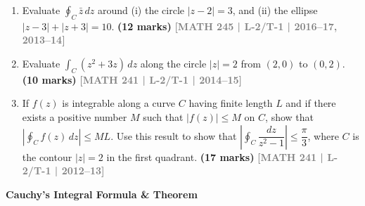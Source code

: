 \documentclass[12pt,a3paper]{article}
\newcommand{\yr}[1]{\hfill\textcolor{gray}{\small\textbf{[#1]}}}
\newcommand{\mk}[1]{\textcolor{orange!70!black}{\small\textbf{(#1 marks)}}}
\newcommand{\subtopic}[2]{%
  \vspace{10pt}
  \noindent\begin{tcolorbox}[colback=#1!8,colframe=#1,boxrule=0.6pt,arc=4pt,
    left=6pt,right=6pt,top=4pt,bottom=4pt]
    \small\bfseries\textcolor{#1}{#2}
  \end{tcolorbox}
  \vspace{2pt}
}
\begin{document}
\begin{enumerate}
\item Evaluate $\oint_{C}\bar{z}\,dz$ around (i) the circle $|z-2|=3$, and (ii) the ellipse $|z-3|+|z+3|=10$.
\mk{12} \yr{MATH 245 | L-2/T-1 | 2016--17, 2013--14}


\item Evaluate $\displaystyle\int_{C}(z^{2}+3z)\,dz$ along the circle $|z|=2$ from $(2,0)$ to $(0,2)$.
\mk{10} \yr{MATH 241 | L-2/T-1 | 2014--15}



\item If $f(z)$ is integrable along a curve $C$ having finite length $L$ and if there exists a positive number $M$ such that $|f(z)|\le M$ on $C$, show that $\left|\oint_{C}f(z)\,dz\right|\le ML$. Use this result to show that $\left|\oint_{C}\dfrac{dz}{z^{2}-1}\right|\le \dfrac{\pi}{3}$, where $C$ is the contour $|z|=2$ in the first quadrant.
\mk{17} \yr{MATH 241 | L-2/T-1 | 2012--13}


\end{enumerate}

\subtopic{cE}{Cauchy's Integral Formula \& Theorem}
\label{sub:s5-cauchy}
\end{document}
